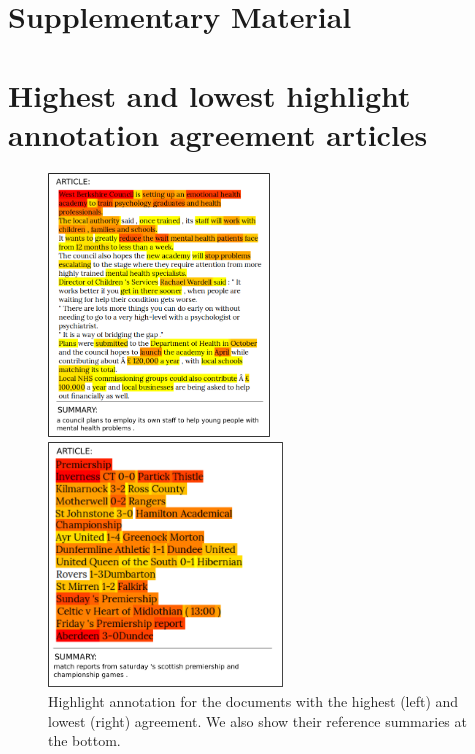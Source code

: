 \documentclass[11pt,a4paper]{article}
\begin{document}
\onecolumn
\newpage
\setcounter{section}{0}
\setcounter{figure}{0}
\setcounter{table}{0}
\section*{Supplementary Material}
\section{Highest and lowest highlight annotation agreement articles}
\begin{figure}[h]
    \centering
    \begin{minipage}{.45\textwidth}
    \centering
    \includegraphics[height=7cm]{heatmap_best}
    \end{minipage}
    \begin{minipage}{.45\textwidth}
    \centering
    \includegraphics[height=6.5cm]{heatmap_negative}
    \end{minipage}
    \caption{Highlight annotation for the documents with the highest (left) and lowest (right) agreement. We also show their reference summaries at the bottom.}
  \label{image:heatmap_both}
\end{figure}
\newpage
\end{document}
